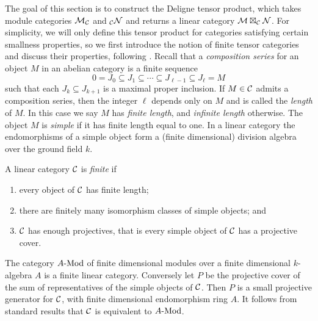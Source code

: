 \documentclass{amsart}
\begin{document}
The goal of this section is to construct the Deligne tensor product, which takes module categories $\mathcal M_\mathcal C$ and ${}_\mathcal C \mathcal N$ and returns a linear category $\mathcal M \boxtimes_\mathcal C \mathcal N$. For simplicity, we will only define this tensor product for categories satisfying certain smallness properties, so we first introduce the notion of finite tensor categories and discuss their properties, following \cite{MR2119143, EGNO}. Recall that a {\em composition series} for an object $M$ in an abelian category is a finite sequence
\begin{equation*}
	0 = J_0 \subseteq J_1 \subseteq \cdots \subseteq J_{\ell-1} \subseteq J_{\ell} = M
\end{equation*} 
such that each $J_k \subseteq J_{k+1}$ is a maximal proper inclusion. If $M \in \mathcal C$ admits a composition series, then the integer $\ell$ depends only on $M$ and is called the {\em length} of $M$. In this case we say $M$ has {\em finite length}, and {\em infinite length} otherwise. The object $M$ is {\em simple} if it has finite length equal to one. In a linear category the endomorphisms of a simple object form a (finite dimensional) division algebra over the ground field $k$. 

\begin{definition} %
	A linear category $\mathcal C$ is {\em finite} if 
	\begin{enumerate}
		\item every object of $\mathcal C$ has finite length; 
		\item there are finitely many isomorphism classes of simple objects; and  
		\item $\mathcal C$ has enough projectives, that is every simple object of $\mathcal C$ has a projective cover.
	\end{enumerate}
\end{definition}

\begin{remark} The category $\Mod{A}{}$ of finite dimensional modules over a finite dimensional $k$-algebra $A$ is a finite linear category. Conversely let $P$ be the projective cover of the sum of representatives of the simple objects of $\mathcal C$. Then $P$ is a small projective generator for $\mathcal C$, with finite dimensional endomorphism ring $A$. It follows from standard results \cite[Ex. 4-F]{MR0166240} that $\mathcal C$ is equivalent to $\Mod{A}{}$.
\end{remark}
\end{document}
